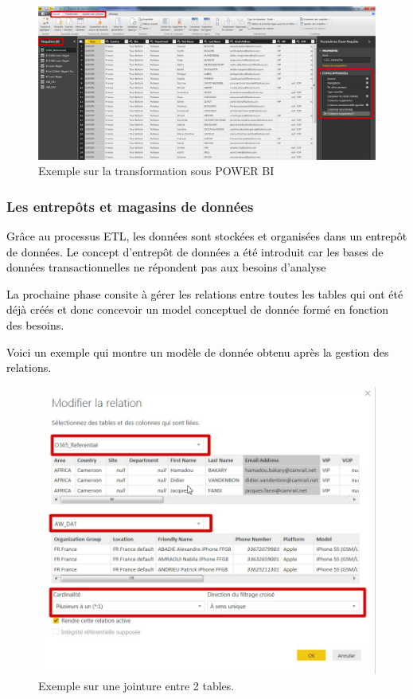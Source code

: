 \documentclass[a4paper,12pt]{report}
\begin{document}
\begin{figure}[H]
	\begin{center}
		\includegraphics[width=0.8\linewidth]{Projet_O365/transformaion}
\end{center}
	\caption{Exemple  sur la transformation sous POWER BI}
	\label{fig:16}	
\end{figure}



\subsubsection{Les entrepôts et magasins de données}

\textcolor{black}{Grâce au processus ETL, les données sont stockées et organisées dans un entrepôt de données. Le
concept d’entrepôt de données a été introduit car les bases de données transactionnelles ne répondent
pas aux besoins d’analyse}

\textcolor{black}{La prochaine phase consite à gérer les relations entre toutes les tables qui ont été déjà créés et donc concevoir un model conceptuel de donnée formé en fonction des besoins.}

\textcolor{black}{Voici un exemple qui montre un modèle de donnée obtenu après la gestion des relations.}

\begin{figure}[H]
	\begin{center}
		\includegraphics[width=0.7\linewidth]{Projet_O365/jointure}
\end{center}
	\caption{Exemple sur une jointure entre 2 tables.}
	\label{fig:17}	
\end{figure}
\end{document}
